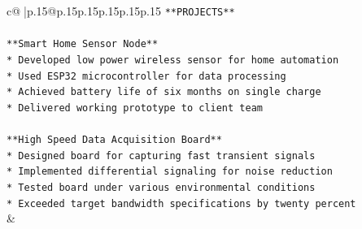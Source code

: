 \documentclass{article}
\begin{document}
{\begin{supertabular}{c@{$\;$}|p{.15\linewidth}@{}p{.15\linewidth}p{.15\linewidth}p{.15\linewidth}p{.15\linewidth}p{.15\linewidth}}
{{{\texttt{**PROJECTS**} \\
\\ 
\texttt{**Smart Home Sensor Node**} \\
\texttt{*   Developed low power wireless sensor for home automation} \\
\texttt{*   Used ESP32 microcontroller for data processing} \\
\texttt{*   Achieved battery life of six months on single charge} \\
\texttt{*   Delivered working prototype to client team} \\
\\ 
\texttt{**High Speed Data Acquisition Board**} \\
\texttt{*   Designed board for capturing fast transient signals} \\
\texttt{*   Implemented differential signaling for noise reduction} \\
\texttt{*   Tested board under various environmental conditions} \\
\texttt{*   Exceeded target bandwidth specifications by twenty percent} \\
            }
        }
    }
    & \\ \\


\end{supertabular}}
\end{document}
